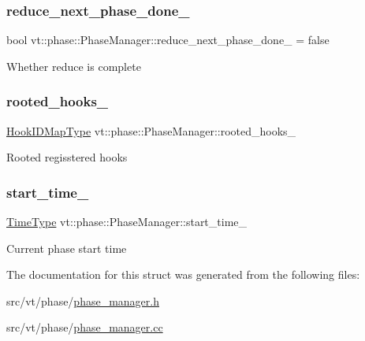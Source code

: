 \subsubsection{\texorpdfstring{reduce\+\_\+next\+\_\+phase\+\_\+done\+\_\+}{reduce\_next\_phase\_done\_}}
{\footnotesize\ttfamily bool vt\+::phase\+::\+Phase\+Manager\+::reduce\+\_\+next\+\_\+phase\+\_\+done\+\_\+ = false\hspace{0.3cm}{\ttfamily [private]}}

Whether reduce is complete \mbox{\label{structvt_1_1phase_1_1_phase_manager_a6a2b1be3c11f4fc91bfb84cc2c47c545}} 
\subsubsection{\texorpdfstring{rooted\+\_\+hooks\+\_\+}{rooted\_hooks\_}}
{\footnotesize\ttfamily \hyperlink{structvt_1_1phase_1_1_phase_manager_a7f9784fa7550beaa1e7d59e639169a8b}{Hook\+I\+D\+Map\+Type} vt\+::phase\+::\+Phase\+Manager\+::rooted\+\_\+hooks\+\_\+\hspace{0.3cm}{\ttfamily [private]}}

Rooted regisstered hooks \mbox{\label{structvt_1_1phase_1_1_phase_manager_a77b80e03b225c32acd50ed727fe4aafd}} 
\subsubsection{\texorpdfstring{start\+\_\+time\+\_\+}{start\_time\_}}
{\footnotesize\ttfamily \hyperlink{namespacevt_a876a9d0cd5a952859c72de8a46881442}{Time\+Type} vt\+::phase\+::\+Phase\+Manager\+::start\+\_\+time\+\_\+\hspace{0.3cm}{\ttfamily [private]}}

Current phase start time 

The documentation for this struct was generated from the following files\+:\begin{DoxyCompactItemize}
\item 
src/vt/phase/\hyperlink{phase__manager_8h}{phase\+\_\+manager.\+h}\item 
src/vt/phase/\hyperlink{phase__manager_8cc}{phase\+\_\+manager.\+cc}\end{DoxyCompactItemize}
